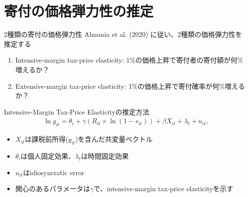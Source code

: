 \documentclass[
  ignorenonframetext,
  aspectratio=169,
]{beamer}
\providecommand{\tightlist}{%
  \setlength{\itemsep}{0pt}\setlength{\parskip}{0pt}}
\begin{document}
\hypertarget{ux5bc4ux4ed8ux306eux4fa1ux683cux5f3eux529bux6027ux306eux63a8ux5b9a}{%
\section{寄付の価格弾力性の推定}\label{ux5bc4ux4ed8ux306eux4fa1ux683cux5f3eux529bux6027ux306eux63a8ux5b9a}}

\begin{frame}{2種類の寄付の価格弾力性}
\protect\hypertarget{ux7a2eux985eux306eux5bc4ux4ed8ux306eux4fa1ux683cux5f3eux529bux6027}{}
Almunia et al. (2020) に従い、2種類の価格弾力性を推定する

\begin{enumerate}
\tightlist
\item
  Intensive-margin tax-price elasticity: 1\%の価格上昇で寄付者の寄付額が何\%増えるか？
\item
  Extensive-margin tax-price elasticity: 1\%の価格上昇で寄付確率が何\%増えるか？
\end{enumerate}
\end{frame}

\begin{frame}{Intensive-Margin Tax-Price Elasticityの推定方法}
\protect\hypertarget{intensive-margin-tax-price-elasticityux306eux63a8ux5b9aux65b9ux6cd5}{}
\begin{align}
  \ln g_{it} = \theta_i + \gamma (R_{it} \times \ln (1 - s_{it}))
  + \beta X_{it} + \lambda_t + u_{it}, \label{eq:intensive}
\end{align}

\begin{itemize}
\tightlist
\item
  \(X_{it}\)は課税前所得(\(y_{it}\))を含んだ共変量ベクトル
\item
  \(\theta_i\)は個人固定効果、\(\lambda_t\)は時間固定効果
\item
  \(u_{it}\)はidiosyncratic error
\item
  関心のあるパラメータは\(\gamma\)で、intensive-margin tax-price elasticityを示す
\end{itemize}
\end{frame}
\end{document}
